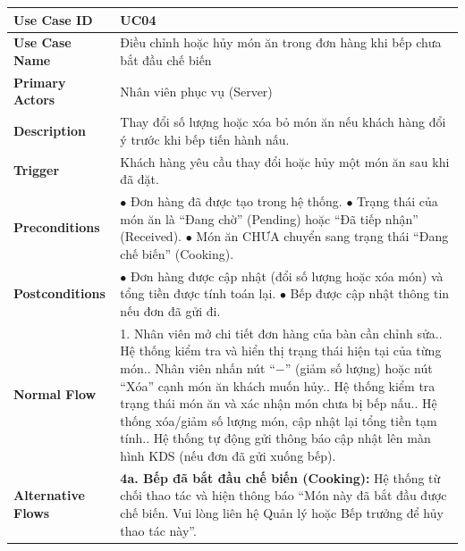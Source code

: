 \begin{longtable}{|p{3.5cm}|p{12.5cm}|}
\hline
\textbf{Use Case ID} & UC04 \\ \hline
\textbf{Use Case Name} & Điều chỉnh hoặc hủy món ăn trong đơn hàng khi bếp chưa bắt đầu chế biến \\ \hline
\textbf{Primary Actors} & Nhân viên phục vụ (Server) \\ \hline
\textbf{Description} & Thay đổi số lượng hoặc xóa bỏ món ăn nếu khách hàng đổi ý trước khi bếp tiến hành nấu. \\ \hline
\textbf{Trigger} & Khách hàng yêu cầu thay đổi hoặc hủy một món ăn sau khi đã đặt. \\ \hline
\textbf{Preconditions} &
$\bullet$ Đơn hàng đã được tạo trong hệ thống.\newline
$\bullet$ Trạng thái của món ăn là ``Đang chờ'' (Pending) hoặc ``Đã tiếp nhận'' (Received).\newline
$\bullet$ Món ăn CHƯA chuyển sang trạng thái ``Đang chế biến'' (Cooking). \\ \hline
\textbf{Postconditions} &
$\bullet$ Đơn hàng được cập nhật (đổi số lượng hoặc xóa món) và tổng tiền được tính toán lại.\newline
$\bullet$ Bếp được cập nhật thông tin nếu đơn đã gửi đi. \\ \hline
\textbf{Normal Flow} &
1. Nhân viên mở chi tiết đơn hàng của bàn cần chỉnh sửa.\newline
2. Hệ thống kiểm tra và hiển thị trạng thái hiện tại của từng món.\newline
3. Nhân viên nhấn nút ``$-$'' (giảm số lượng) hoặc nút ``Xóa'' cạnh món ăn khách muốn hủy.\newline
4. Hệ thống kiểm tra trạng thái món ăn và xác nhận món chưa bị bếp nấu.\newline
5. Hệ thống xóa/giảm số lượng món, cập nhật lại tổng tiền tạm tính.\newline
6. Hệ thống tự động gửi thông báo cập nhật lên màn hình KDS (nếu đơn đã gửi xuống bếp). \\ \hline
\textbf{Alternative Flows} &
\textbf{4a. Bếp đã bắt đầu chế biến (Cooking):} Hệ thống từ chối thao tác và hiện thông báo ``Món này đã bắt đầu được chế biến. Vui lòng liên hệ Quản lý hoặc Bếp trưởng để hủy thao tác này''. \\ \hline
\end{longtable}

